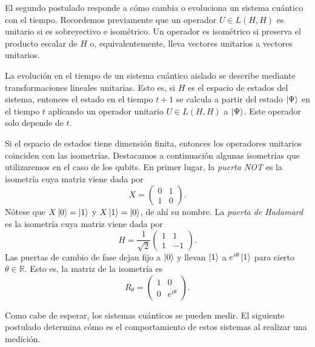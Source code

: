 \documentclass{article}
\begin{document}
El segundo postulado responde a cómo cambia o evoluciona un sistema cuántico %
con el tiempo. Recordemos previamente que un operador $U \in L(H,H)$ es unitario si es sobreyectivo e isométrico. Un operador es isométrico si preserva el producto escalar de $H$ o, equivalentemente, lleva vectores unitarios a vectores unitarios.

\begin{postulate}[Evolución] \label{post:2}
La evolución en el tiempo de un sistema cuántico aislado se describe mediante transformaciones lineales unitarias. Esto es, si $H$ es el espacio de estados del sistema, entonces el estado en el tiempo $t+1$ se calcula a partir del estado $\ket{\Psi}$ en el tiempo $t$ aplicando un operador unitario $U \in L(H, H)$ a $\ket{\Psi}$. Este operador solo depende de $t$.
\end{postulate}

Si el espacio de estados tiene dimensión finita, entonces los operadores unitarios coinciden con las isometrías.
Destacamos a continuación algunas isometrías que utilizaremos en el caso de los qubits. En primer lugar, la \emph{puerta NOT} es la isometría cuya matriz viene dada por
\[ X = \begin{pmatrix}
 0 & 1 \\ 1 & 0
\end{pmatrix}.\]
Nótese que $X \ket{0} = \ket{1}$ y $X \ket{1} = \ket{0}$, de ahí su nombre. La \emph{puerta de Hadamard} es la isometría cuya matriz viene dada por
\[ H = \frac{1}{\sqrt{2}}\begin{pmatrix}
 1 & 1 \\ 1 & -1
\end{pmatrix}.\]
Las puertas de cambio de fase dejan fijo a $\ket{0}$ y llevan $\ket{1}$ a $e^{i \theta} \ket{1}$ para cierto $\theta \in \mathbb{R}$. Esto es, la matriz de la isometría es
\[ R_\theta = \begin{pmatrix}
 1 & 0 \\ 0 & e^{i \theta}
\end{pmatrix}.\]

Como cabe de esperar, los sistemas cuánticos se pueden medir. El siguiente postulado determina cómo es el comportamiento de estos sistemas al realizar una medición.
\end{document}
